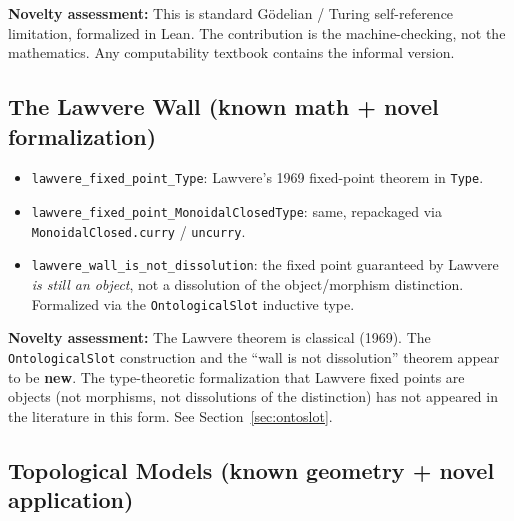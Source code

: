 \documentclass[11pt]{article}
\begin{document}
\textbf{Novelty assessment:} This is standard G\"odelian / Turing self-reference limitation,
formalized in Lean. The contribution is the machine-checking, not the mathematics.
Any computability textbook contains the informal version.

\subsection{The Lawvere Wall (known math + novel formalization)}

\begin{itemize}
\item \texttt{lawvere\_fixed\_point\_Type}: Lawvere's 1969 fixed-point theorem in \texttt{Type}.
\item \texttt{lawvere\_fixed\_point\_MonoidalClosedType}: same, repackaged via
  \texttt{MonoidalClosed.curry} / \texttt{uncurry}.
\item \texttt{lawvere\_wall\_is\_not\_dissolution}: the fixed point guaranteed by Lawvere
  \emph{is still an object}, not a dissolution of the object/morphism distinction.
  Formalized via the \texttt{OntologicalSlot} inductive type.
\end{itemize}

\textbf{Novelty assessment:} The Lawvere theorem is classical (1969). The
\texttt{OntologicalSlot} construction and the ``wall is not dissolution'' theorem
appear to be \textbf{new}. The type-theoretic formalization that Lawvere fixed
points are objects (not morphisms, not dissolutions of the distinction) has not
appeared in the literature in this form. See Section~\ref{sec:ontoslot}.

\subsection{Topological Models (known geometry + novel application)}
\end{document}
